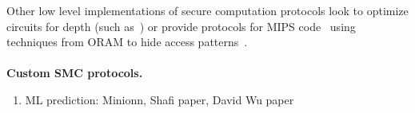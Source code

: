 Other low level implementations of secure computation protocols look to optimize circuits for depth (such as~\cite{ddkssz15}) or provide protocols for MIPS code~\cite{mips} using techniques from ORAM to hide access patterns~\cite{oram1,oram2}.
\\\\
\noindent\textbf{Custom SMC protocols.}


\begin{enumerate}

\item ML prediction: Minionn, Shafi paper, David Wu paper


\end{enumerate}